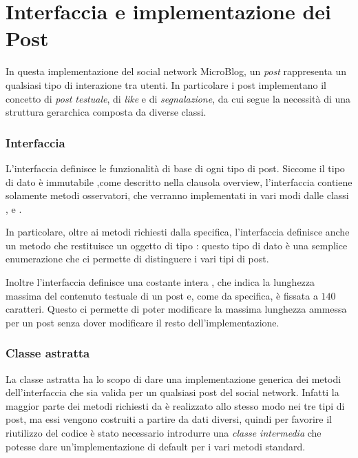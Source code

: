 \section{Interfaccia e implementazione dei Post}
\label{sec:posts}

In questa implementazione del social network MicroBlog, un \emph{post} rappresenta un qualsiasi tipo di interazione tra utenti. In particolare i post implementano il concetto di \emph{post testuale}, di \emph{like} e di \emph{segnalazione}, da cui segue la necessità di una struttura gerarchica composta da diverse classi.

\subsubsection*{Interfaccia }
L'interfaccia  definisce le funzionalità di base di ogni tipo di post. Siccome il tipo di dato  è immutabile ,come descritto nella clausola overview, l'interfaccia contiene solamente metodi osservatori, che verranno implementati in vari modi dalle classi ,  e .

In particolare, oltre ai metodi richiesti dalla specifica, l'interfaccia  definisce anche un metodo  che restituisce un oggetto di tipo : questo tipo di dato è una semplice enumerazione che ci permette di distinguere i vari tipi di post.

Inoltre l'interfaccia definisce una costante intera , che indica la lunghezza massima del contenuto testuale di un post e, come da specifica, è fissata a $140$ caratteri. Questo ci permette di poter modificare la massima lunghezza ammessa per un post senza dover modificare il resto dell'implementazione.

\subsubsection*{Classe astratta }
La classe astratta  ha lo scopo di dare una implementazione generica dei metodi dell'interfaccia  che sia valida per un qualsiasi post del social network. Infatti la maggior parte dei metodi richiesti da  è realizzato allo stesso modo nei tre tipi di post, ma essi vengono costruiti a partire da dati diversi, quindi per favorire il riutilizzo del codice è stato necessario introdurre una \emph{classe intermedia} che potesse dare un'implementazione di default per i vari metodi standard.

